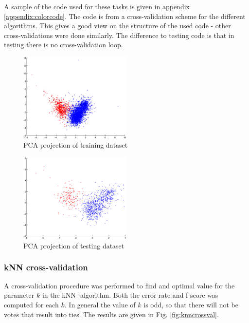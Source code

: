 \documentclass[twoside]{article}
\begin{document}
\begin{multicols}{2}
A sample of the code used for these tasks is given in appendix \ref{appendix:colorcode}. The code is from a cross-validation scheme for the different
algorithms. This gives a good view on the structure of the used code - other cross-validations were done similarly. The difference to testing code is
that in testing there is no cross-validation loop.

\begin{figure}[H]
\centering
\includegraphics[width=0.5\textwidth]{trainingpca}
\caption{PCA projection of training dataset}
\label{fig:color_training_pca}
\end{figure}

\begin{figure}[H]
\centering
\includegraphics[width=0.5\textwidth]{testpca}
\caption{PCA projection of testing dataset}
\label{fig:color_testing_pca}
\end{figure}

\subsubsection{kNN cross-validation}

A cross-validation procedure was performed to find and optimal value for the parameter $k$ in the 
kNN -algorithm. Both the error rate and f-score was computed for each $k$. In general the value
of $k$ is odd, so that there will not be votes that result into ties. The results are given in
Fig. \ref{fig:knncrossval}.


\end{multicols}
\end{document}
